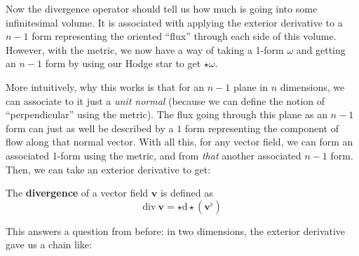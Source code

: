 	Now the divergence operator should tell us how much is going into some infinitesimal volume. It is associated with applying the exterior derivative to a $n-1$ form representing the oriented ``flux'' through each side of this volume. However, with the metric, we now have a way of taking a 1-form $\omega$ and getting an $n-1$ form by using our Hodge star to get $\star \omega$. 
	 
	More intuitively, why this works is that for an $n-1$ plane in $n$ dimensions, we can associate to it just a \emph{unit normal} (because we can define the notion of ``perpendicular'' using the metric). The flux going through this plane as an $n-1$ form can just as well be described by a $1$ form representing the component of flow along that normal vector. With all this, for any vector field, we can form an associated 1-form using the metric, and from \emph{that} another associated $n-1$ form. Then, we can take an exterior derivative to get:
	 
	\begin{defn}
		The \textbf{divergence} of a vector field $\mathbf v$ is defined as 
		\begin{equation}
			\mathrm{div} ~ \mathbf v = \star \mathrm d \star (\mathbf v^\flat)
		\end{equation}
	\end{defn} 
	
	This answers a question from before: in two dimensions, the exterior derivative gave us a chain like:
	
